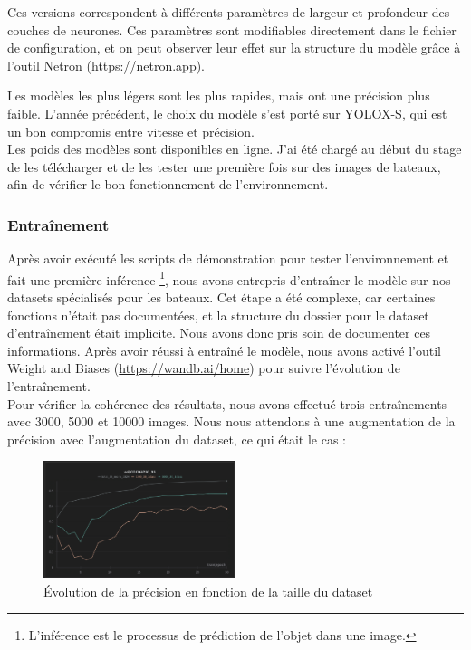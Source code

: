 Ces versions correspondent à différents paramètres de largeur et profondeur des couches de neurones.
Ces paramètres sont modifiables directement dans le fichier de configuration,
et on peut observer leur effet sur la structure du modèle grâce à l'outil Netron
(\url{https://netron.app}).

Les modèles les plus légers sont les plus rapides, mais ont une précision plus faible.
L'année précédent, le choix du modèle s'est porté sur YOLOX-S, qui est un bon compromis entre
vitesse et précision.\\

Les poids des modèles sont disponibles en ligne. J'ai été chargé au début du stage de les
télécharger et de les tester une première fois sur des images de bateaux, afin de vérifier
le bon fonctionnement de l'environnement.\\

\subsubsection{Entraînement}

Après avoir exécuté les scripts de démonstration pour tester l'environnement
et fait une première inférence \footnote{L'inférence est le processus de prédiction
de l'objet dans une image.}, nous avons entrepris d'entraîner le modèle sur nos datasets spécialisés pour
les bateaux. Cet étape a été complexe, car certaines fonctions n'était pas documentées, et
la structure du dossier pour le dataset d'entraînement était implicite. Nous avons donc pris soin de documenter
ces informations. Après avoir réussi à entraîné le modèle, nous avons activé l'outil
Weight and Biases (\url{https://wandb.ai/home}) pour suivre l'évolution de l'entraînement.\\

Pour vérifier la cohérence des résultats, nous avons effectué trois entraînements avec 3000, 5000
et 10000 images. Nous nous attendons à une augmentation de la précision avec l'augmentation du dataset,
ce qui était le cas :

\begin{figure}[H]
    \centering
    \includegraphics[width=0.5\textwidth]{./img/dataset_size.png}
    \caption{Évolution de la précision en fonction de la taille du dataset}
\end{figure}

